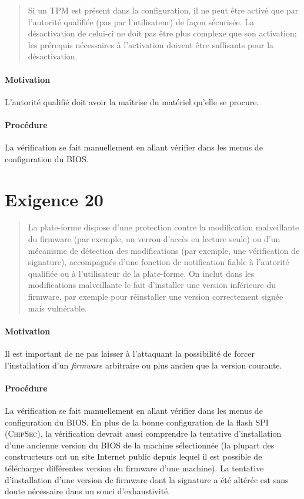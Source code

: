 \documentclass{report}
\begin{document}
\begin{quote}
  Si un TPM est présent dans la configuration, il ne peut être activé que par
  l’autorité qualifiée (pas par l’utilisateur) de façon sécurisée.
  La désactivation de celui-ci ne doit pas être plus complexe que son
  activation; les prérequis nécessaires à l’activation doivent être suffisants
  pour la désactivation.
\end{quote}

\paragraph{Motivation}
%
L’autorité qualifié doit avoir la maîtrise du matériel qu’elle se procure.

\paragraph{Procédure}
%
La vérification se fait manuellement en allant vérifier dans les menus de
configuration du BIOS.

\section{Exigence 20}

\begin{quote}
  La plate-forme dispose d’une protection contre la modification malveillante du
  firmware (par exemple, un verrou d’accès en lecture seule) ou d’un mécanisme
  de détection des modifications (par exemple, une vérification de signature),
  accompagnés d’une fonction de notification fiable à l’autorité qualifiée ou à
  l’utilisateur de la plate-forme.
  On inclut dans les modifications malveillante le fait d’installer une version
  inférieure du firmware, par exemple pour réinstaller une version correctement
  signée mais vulnérable.
\end{quote}

\paragraph{Motivation}
%
Il est important de ne pas laisser à l’attaquant la possibilité de forcer
l’installation d’un \emph{firmware} arbitraire ou plus ancien que la version
courante.

\paragraph{Procédure}
%
La vérification se fait manuellement en allant vérifier dans les menus de
configuration du BIOS.
%
En plus de la bonne configuration de la flash SPI (\textsc{ChipSec}), la
vérification devrait aussi comprendre la tentative d’installation d’une ancienne
version du BIOS de la machine sélectionnée (la plupart des constructeurs ont un
site Internet public depuis lequel il est possible de télécharger différentes
version du firmware d’une machine).
%
La tentative d’installation d’une version de firmware dont la signature a été
altérée est sans doute nécessaire dans un souci d’exhaustivité.
\end{document}
